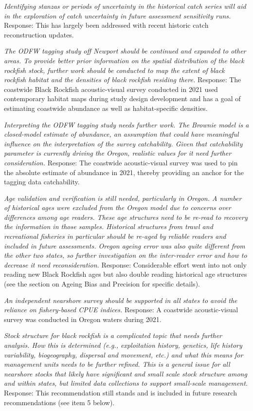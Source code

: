 \documentclass[11pt,
  english,
  letterpaper,
]{article}
\begin{document}
\textit{Identifying stanzas or periods of uncertainty in the historical catch series will aid in the exploration of catch uncertainty in future assessment sensitivity runs.} Response: This has largely been addressed with recent historic catch reconstruction updates.

\textit{The ODFW tagging study off Newport should be continued and expanded to other areas. To provide better prior information on the spatial distribution of the black rockfish stock, further work should be conducted to map the extent of black rockfish habitat and the densities of black rockfish residing there.} Response: The coastwide Black Rockfish acoustic-visual survey conducted in 2021 used contemporary habitat maps during study design development and has a goal of estimating coastwide abundance as well as habitat-specific densities.

\textit{Interpreting the ODFW tagging study needs further work. The Brownie model is a closed-model estimate of abundance, an assumption that could have meaningful influence on the interpretation of the survey catchability. Given that catchability parameter is currently driving the Oregon, realistic values for it need further consideration.} Response: The coastwide acoustic-visual survey was used to pin the absolute estimate of abundance in 2021, thereby providing an anchor for the tagging data catchability.

\textit{Age validation and verification is still needed, particularly in Oregon. A number of historical ages were excluded from the Oregon model due to concerns over differences among age readers. These age structures need to be re-read to recovery the information in those samples. Historical structures from trawl and recreational fisheries in particular should be re-aged by reliable readers and included in future assessments. Oregon ageing error was also quite different from the other two states, so further investigation on the inter-reader error and how to decrease it need reconsideration.} Response: Considerable effort went into not only reading new Black Rockfish ages but also double reading historical age structures (see the section on Ageing Bias and Precision for specific details).

\textit{An independent nearshore survey should be supported in all states to avoid the reliance on fishery-based CPUE indices.} Response: A coastwide acoustic-visual survey was conducted in Oregon waters during 2021.

\textit{Stock structure for black rockfish is a complicated topic that needs further analysis. How this is determined (e.g., exploitation history, genetics, life history variability, biogeography, dispersal and movement, etc.) and what this means for management units needs to be further refined. This is a general issue for all nearshore stocks that likely have significant and small scale stock structure among and within states, but limited data collections to support small-scale management.} Response: This recommendation still stands and is included in future research recommendations (see item 5 below).
\end{document}
